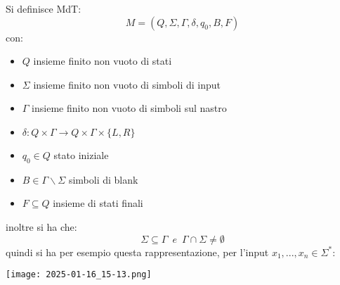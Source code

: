 	\begin{definition}
		Si definisce MdT:
		$$M=(Q,\Sigma,\Gamma,\delta,q_0,B,F)$$
		con:
		\begin{itemize}
			\item $Q$ insieme finito non vuoto di stati
			\item $\Sigma$ insieme finito non vuoto di simboli di input
			\item $\Gamma$ insieme finito non vuoto di simboli sul nastro
			\item $\delta:Q\times\Gamma\to Q\times\Gamma\times\{L,R\}$
			\item $q_0\in Q$ stato iniziale
			\item $B\in\Gamma\backslash\Sigma$ simboli di blank
			\item $F\subseteq Q$ insieme di stati finali
		\end{itemize}
		inoltre si ha che:
		$$\Sigma\subseteq \Gamma\,\,\,e\,\,\,\Gamma\cap\Sigma\neq\emptyset$$
		quindi si ha per esempio questa rappresentazione, per l'input $x_1,...,x_n\in\Sigma^*$:
		\begin{center}
		\texttt{[image: 2025-01-16\_15-13.png]}


\end{center}
\end{definition}

